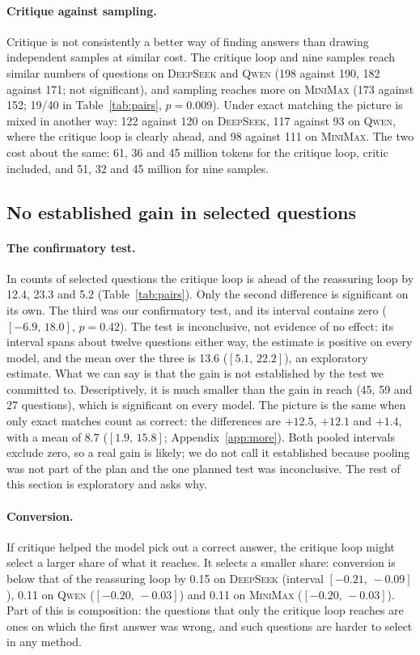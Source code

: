 \documentclass[11pt]{article}
\newcommand{\ds}{\textsc{DeepSeek}}
\newcommand{\qw}{\textsc{Qwen}}
\newcommand{\mm}{\textsc{MiniMax}}
\newcommand{\ci}[2]{$[#1,\,#2]$}
\begin{document}
\paragraph{Critique against sampling.}
Critique is not consistently a better way of finding answers than drawing independent samples at similar cost.
The critique loop and nine samples reach similar numbers of questions on \ds{} and \qw{} (198 against 190, 182 against 171; not significant), and sampling reaches more on \mm{} (173 against 152; 19/40 in Table~\ref{tab:pairs}, $p=0.009$).
Under exact matching the picture is mixed in another way: 122 against 120 on \ds, 117 against 93 on \qw, where the critique loop is clearly ahead, and 98 against 111 on \mm.
The two cost about the same: 61, 36 and 45 million tokens for the critique loop, critic included, and 51, 32 and 45 million for nine samples.


\subsection{No established gain in selected questions}
\label{sec:select}

\paragraph{The confirmatory test.}
In counts of selected questions the critique loop is ahead of the reassuring loop by 12.4, 23.3 and 5.2 (Table~\ref{tab:pairs}).
Only the second difference is significant on its own.
The third was our confirmatory test, and its interval contains zero (\ci{-6.9}{18.0}, $p=0.42$).
The test is inconclusive, not evidence of no effect: its interval spans about twelve questions either way, the estimate is positive on every model, and the mean over the three is 13.6 (\ci{5.1}{22.2}), an exploratory estimate.
What we can say is that the gain is not established by the test we committed to.
Descriptively, it is much smaller than the gain in reach (45, 59 and 27 questions), which is significant on every model.
The picture is the same when only exact matches count as correct: the differences are $+12.5$, $+12.1$ and $+1.4$, with a mean of 8.7 (\ci{1.9}{15.8}; Appendix~\ref{app:more}).
Both pooled intervals exclude zero, so a real gain is likely; we do not call it established because pooling was not part of the plan and the one planned test was inconclusive.
The rest of this section is exploratory and asks why.

\paragraph{Conversion.}
If critique helped the model pick out a correct answer, the critique loop might select a larger share of what it reaches.
It selects a smaller share: conversion is below that of the reassuring loop by 0.15 on \ds{} (interval \ci{-0.21}{-0.09}), 0.11 on \qw{} (\ci{-0.20}{-0.03}) and 0.11 on \mm{} (\ci{-0.20}{-0.03}).
Part of this is composition: the questions that only the critique loop reaches are ones on which the first answer was wrong, and such questions are harder to select in any method.
\end{document}
